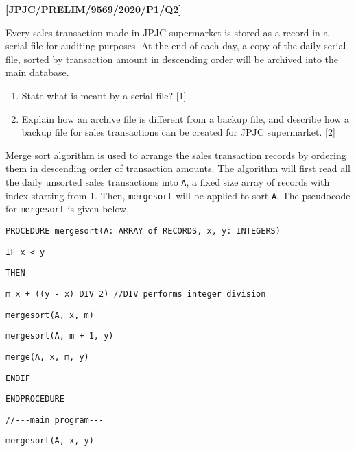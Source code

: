 \item \textbf{{[}JPJC/PRELIM/9569/2020/P1/Q2{]} }

Every sales transaction made in JPJC supermarket is stored as a record
in a serial file for auditing purposes. At the end of each day, a
copy of the daily serial file, sorted by transaction amount in descending
order will be archived into the main database. 
\begin{enumerate}
\item State what is meant by a serial file? \hfill{}{[}1{]}
\item Explain how an archive file is different from a backup file, and describe
how a backup file for sales transactions can be created for JPJC supermarket.\hfill{}
{[}2{]}
\end{enumerate}
Merge sort algorithm is used to arrange the sales transaction records
by ordering them in descending order of transaction amounts. The algorithm
will first read all the daily unsorted sales transactions into \texttt{A},
a fixed size array of records with index starting from 1. Then, \texttt{mergesort}
will be applied to sort \texttt{A}. The pseudocode for \texttt{mergesort}
is given below, 

\noindent\begin{minipage}[t]{1\columnwidth}%
\texttt{PROCEDURE mergesort(A: ARRAY of RECORDS, x, y: INTEGERS)}

\texttt{\qquad{}IF x < y }

\texttt{\qquad{}\qquad{}THEN }

\texttt{\qquad{}\qquad{}\qquad{}m x + ((y - x) DIV 2) //DIV performs
integer division }

\texttt{\qquad{}\qquad{}\qquad{}mergesort(A, x, m) }

\texttt{\qquad{}\qquad{}\qquad{}mergesort(A, m + 1, y) }

\texttt{\qquad{}\qquad{}\qquad{}merge(A, x, m, y) }

\texttt{\qquad{}ENDIF }

\texttt{ENDPROCEDURE }

\texttt{//-{}-{}-main program-{}-{}- }

\texttt{mergesort(A, x, y) }%
\end{minipage}

